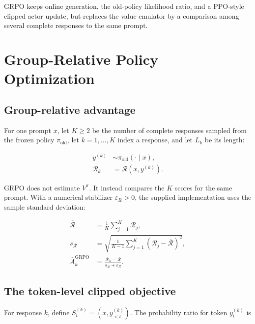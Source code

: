 \documentclass[11pt]{article}
\begin{document}
GRPO keeps online generation, the old-policy likelihood ratio, and a PPO-style
clipped actor update, but replaces the value emulator by a comparison among
several complete responses to the same prompt.

\newpage
\section{Group-Relative Policy Optimization}

\subsection{Group-relative advantage}

For one prompt \(x\), let \(K\geq2\) be the number of complete responses
sampled from the frozen policy \(\pi_{\mathrm{old}}\), let
\(k=1,\ldots,K\) index a response, and let \(L_k\) be its length:

\begin{equation}
    \begin{split}
    y^{(k)}&\sim\pi_{\mathrm{old}}(\cdot\mid x),\\
    \mathcal R_k&=\mathcal R(x,y^{(k)}).
    \end{split}
    \label{eq:grpo-rollouts}
\end{equation}

GRPO does not estimate \(V^\pi\).  It instead compares the \(K\) scores for
the same prompt.  With a numerical stabilizer \(\varepsilon_R>0\), the
supplied implementation uses the sample standard deviation:

\begin{equation}
    \begin{split}
    \overline{\mathcal R}
      &=\frac{1}{K}\sum_{j=1}^{K}\mathcal R_j,\\
    s_{\mathcal R}
      &=\sqrt{\frac{1}{K-1}
        \sum_{j=1}^{K}(\mathcal R_j-\overline{\mathcal R})^2},\\
    \widehat A_k^{\mathrm{GRPO}}
      &=\frac{\mathcal R_k-\overline{\mathcal R}}
              {s_{\mathcal R}+\varepsilon_R}.
    \end{split}
    \label{eq:grpo-advantage}
\end{equation}

\subsection{The token-level clipped objective}

For response \(k\), define \(S_t^{(k)}=(x,y_{<t}^{(k)})\).  The probability
ratio for token \(y_t^{(k)}\) is
\end{document}

